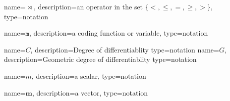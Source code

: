 
	\newcommand{\relop}{\ensuremath{\bowtie}}
	{%
		name=\ensuremath{\relop},
		description=an operator in the set \ensuremath{\{<, \leq, =, \geq, >\}},
		type=notation
	}

	\newcommand{\code}[1]{\ensuremath{\texttt{#1}}}
	{%
		name=\code{m},
		description=a coding function or variable,
		type=notation
	}

	\newcommand{\contdeg}[1]{\ensuremath{\gls{not:contdeg}^{#1}}}
	{%
		name=\ensuremath{C},
		description=Degree of differentiablity
		type=notation
	}
	\newcommand{\contdeggeom}[1]{\ensuremath{\gls{not:contdeggeom}^{#1}}}
	{%
		name=\ensuremath{G},
		description=Geometric degree of differentiablity
		type=notation
	}
	\newcommand{\der}{\ensuremath{\mathrm{d}}}

	{%
		name=\ensuremath{m},
		description=a scalar,
		type=notation
	}

	\renewcommand{\vec}[1]{\ensuremath{\boldsymbol{#1}}}
	{%
		name=\vec{m},
		description=a vector,
		type=notation
	}

